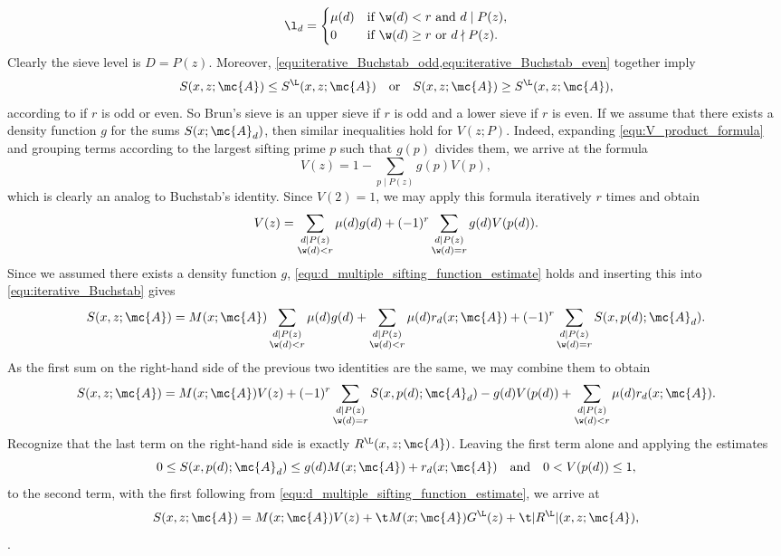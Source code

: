     \[
      \l_{d} = \begin{cases} \mu(d) & \text{if $\w(d) < r$ and $d \mid P(z)$}, \\ 0 & \text{if $\w(d) \ge r$ or $d \nmid P(z)$}. \end{cases}
    \]
    Clearly the sieve level is $D = P(z)$. Moreover, \cref{equ:iterative_Buchstab_odd,equ:iterative_Buchstab_even} together imply
    \[
      S(x,z;\mc{A}) \le S^{\L}(x,z;\mc{A}) \quad \text{or} \quad S(x,z;\mc{A}) \ge S^{\L}(x,z;\mc{A}),
    \]
    according to if $r$ is odd or even. So Brun's sieve is an upper sieve if $r$ is odd and a lower sieve if $r$ is even. If we assume that there exists a density function $g$ for the sums $S(x;\mc{A}_{d})$, then similar inequalities hold for $V(z;P)$. Indeed, expanding \cref{equ:V_product_formula} and grouping terms according to the largest sifting prime $p$ such that $g(p)$ divides them, we arrive at the formula
    \[
      V(z) = 1-\sum_{p \mid P(z)}g(p)V(p),
    \]
    which is clearly an analog to Buchstab's identity. Since $V(2) = 1$, we may apply this formula iteratively $r$ times and obtain
    \[
      V(z) = \sum_{\substack{d \mid P(z) \\ \w(d) < r}}\mu(d)g(d)+(-1)^{r}\sum_{\substack{d \mid P(z) \\ \w(d) = r}}g(d)V(p(d)).
    \]
    Since we assumed there exists a density function $g$, \cref{equ:d_multiple_sifting_function_estimate} holds and inserting this into \cref{equ:iterative_Buchstab} gives
    \[
      S(x,z;\mc{A}) = M(x;\mc{A})\sum_{\substack{d \mid P(z) \\ \w(d) < r}}\mu(d)g(d)+\sum_{\substack{d \mid P(z) \\ \w(d) < r}}\mu(d)r_{d}(x;\mc{A})+(-1)^{r}\sum_{\substack{d \mid P(z) \\ \w(d) = r}}S(x,p(d);\mc{A}_{d}).
    \]
    As the first sum on the right-hand side of the previous two identities are the same, we may combine them to obtain
    \[
      S(x,z;\mc{A}) = M(x;\mc{A})V(z)+(-1)^{r}\sum_{\substack{d \mid P(z) \\ \w(d) = r}}S(x,p(d);\mc{A}_{d})-g(d)V(p(d))+\sum_{\substack{d \mid P(z) \\ \w(d) < r}}\mu(d)r_{d}(x;\mc{A}).
    \]
    Recognize that the last term on the right-hand side is exactly $R^{\L}(x,z;\mc{A})$. Leaving the first term alone and applying the estimates
    \[
      0 \le S(x,p(d);\mc{A}_{d}) \le g(d)M(x;\mc{A})+r_{d}(x;\mc{A}) \quad \text{and} \quad 0 < V(p(d)) \le 1,
    \]
    to the second term, with the first following from \cref{equ:d_multiple_sifting_function_estimate}, we arrive at
    \[
      S(x,z;\mc{A}) = M(x;\mc{A})V(z)+ \t M(x;\mc{A})G^{\L}(z)+\t|R^{\L}|(x,z;\mc{A}),
    \]
    .

